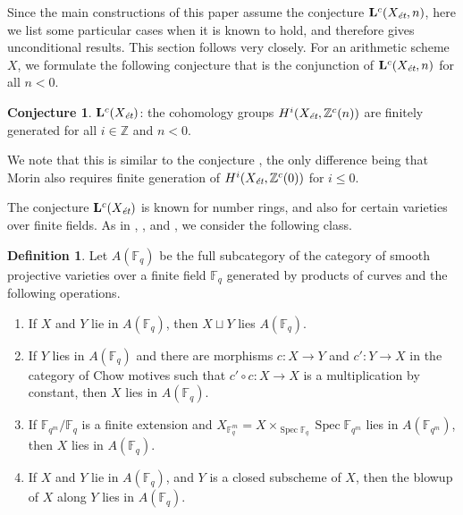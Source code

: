\documentclass{article}
\DeclareMathOperator{\Spec}{Spec}
\newcommand{\FF}{\mathbb{F}}
\newcommand{\ZZ}{\mathbb{Z}}
\newcommand{\et}{\text{\it ét}}
\theoremstyle{definition}
\newtheorem{definition}[theorem]{Definition}
\newtheorem*{conjecture*}{Conjecture}
\numberwithin{equation}{section}
\begin{document}
Since the main constructions of this paper assume the conjecture
$\mathbf{L}^c (X_\et,n)$, here we list some particular cases when it is known to
hold, and therefore gives unconditional results. This section follows
\cite[\S 5]{Morin-2014} very closely. For an arithmetic scheme $X$, we formulate
the following conjecture that is the conjunction of $\mathbf{L}^c (X_\et,n)$ for
all $n < 0$.

\begin{conjecture*}
  $\mathbf{L}^c (X_\et)$: the cohomology groups $H^i (X_\et, \ZZ^c (n))$ are
  finitely generated for all $i \in \ZZ$ and $n < 0$.
\end{conjecture*}

We note that this is similar to the conjecture
\cite[Definition~5.8]{Morin-2014}, the only difference being that Morin also
requires finite generation of $H^i (X_\et, \ZZ^c (0))$ for $i \le 0$.

The conjecture $\mathbf{L}^c (X_\et)$ is known for number rings, and also for
certain varieties over finite fields. As in \cite{Soule-1984},
\cite{Geisser-2004}, and \cite{Morin-2014}, we consider the following class.

\begin{definition}
  Let $A (\FF_q)$ be the full subcategory of the category of smooth projective
  varieties over a finite field $\FF_q$ generated by products of curves and the
  following operations.
  \begin{enumerate}
  \item[1)] If $X$ and $Y$ lie in $A (\FF_q)$, then $X \sqcup Y$ lies
    $A (\FF_q)$.
  \item[2)] If $Y$ lies in $A (\FF_q)$ and there are morphisms $c\colon X\to Y$
    and $c'\colon Y\to X$ in the category of Chow motives such that
    $c'\circ c\colon X\to X$ is a multiplication by constant, then
    $X$ lies in $A (\FF_q)$.
  \item[3)] If $\FF_{q^m}/\FF_q$ is a finite extension and
    $X_{\FF_q^m} = X \times_{\Spec \FF_q} \Spec \FF_{q^m}$ lies in
    $A (\FF_{q^m})$, then $X$ lies in $A (\FF_q)$.
  \item[4)] If $X$ and $Y$ lie in $A (\FF_q)$, and $Y$ is a closed subscheme of
    $X$, then the blowup of $X$ along $Y$ lies in $A (\FF_q)$.
  \end{enumerate}
\end{definition}
\end{document}
